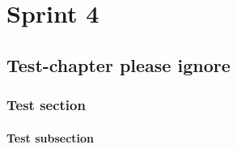 \part{Sprint 4}
\chapter{Test-chapter please ignore}
\section{Test section}
\subsection{Test subsection}
